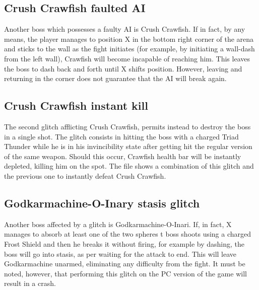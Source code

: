 \subsection{Crush Crawfish faulted AI}\label{glitch:Crawfish_AI}
Another boss which possesses a faulty AI is Crush Crawfish.
If in fact, by any means, the player manages to position X in the bottom right corner of the arena and sticks to the wall as the fight initiates (for example, by initiating a wall-dash from the left wall), Crawfish will become incapable of reaching him. This leaves the boss to dash back and forth until X shifts position. However, leaving and returning in the corner does not guarantee that the AI will break again.

\subsection{Crush Crawfish instant kill}\label{glitch:Crawfish}
The second glitch afflicting Crush Crawfish, permits instead to destroy the boss in a single shot. The glitch consists in hitting the boss with a charged Triad Thunder while he is in his invincibility state after getting hit the regular version of the same weapon. Should this occur, Crawfish health bar will be instantly depleted, killing him on the spot. The file  shows a combination of this glitch and the previous one to instantly defeat Crush Crawfish.

\subsection{Godkarmachine-O-Inary stasis glitch}\label{glitch:Karmachine}
Another boss affected by a glitch is Godkarmachine-O-Inari. If, in fact, X manages to absorb at least one of the two spheres t boss shoots using a charged Frost Shield and then he breaks it without firing, for example by dashing, the boss will go into stasis, as per waiting for the attack to end. This will leave Godkarmachine unarmed, eliminating any difficulty from the fight. It must be noted, however, that performing this glitch on the PC version of the game will result in a crash.
